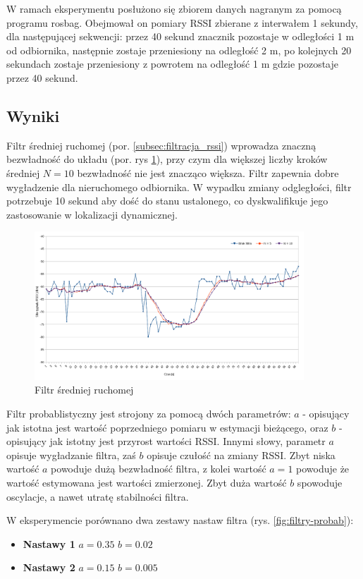 W ramach eksperymentu posłużono się zbiorem danych nagranym za pomocą programu rosbag. Obejmował on pomiary RSSI zbierane z interwałem 1 sekundy, dla następującej sekwencji: przez 40 sekund znacznik pozostaje w odległości 1 m od odbiornika, następnie zostaje przeniesiony na odległość 2 m, po kolejnych 20 sekundach zostaje przeniesiony z powrotem na odległość 1 m gdzie pozostaje przez 40 sekund. 

\subsection{Wyniki}
Filtr średniej ruchomej (por. \ref{subsec:filtracja_rssi}) wprowadza znaczną bezwładność do układu (por. rys \ref{fig:filtry-avg}), przy czym dla większej liczby kroków średniej $N = 10$ bezwładność nie jest znacząco większa. Filtr zapewnia dobre wygładzenie dla nieruchomego odbiornika. W wypadku zmiany odgległości, filtr potrzebuje 10 sekund aby dość do stanu ustalonego, co dyskwalifikuje jego zastosowanie w lokalizacji dynamicznej. 

\begin{figure}[ht]
\centering
\includegraphics[width=0.9\textwidth]{img/filtr-avb.png}
\caption{Filtr średniej ruchomej}
\label{fig:filtry-avg}
\end{figure}

Filtr probablistyczny jest strojony za pomocą dwóch parametrów: $a$ - opisujący jak istotna jest wartość poprzedniego pomiaru w estymacji bieżącego, oraz $b$ - opisujący jak istotny jest przyrost wartości RSSI. Innymi słowy, parametr $a$ opisuje wygładzanie filtra, zaś $b$ opisuje czułość na zmiany RSSI. Zbyt niska wartość $a$ powoduje dużą bezwładność filtra, z kolei wartość $a=1$ powoduje że wartość estymowana jest wartości zmierzonej. Zbyt duża wartość $b$ spowoduje oscylacje, a nawet utratę stabilności filtra. 

W eksperymencie porównano dwa zestawy nastaw filtra (rys. \ref{fig:filtry-probab}):
\begin{itemize}
 \item \textbf{Nastawy 1} $a=0.35$ $b=0.02$
 \item \textbf{Nastawy 2} $a=0.15$ $b=0.005$
\end{itemize}


